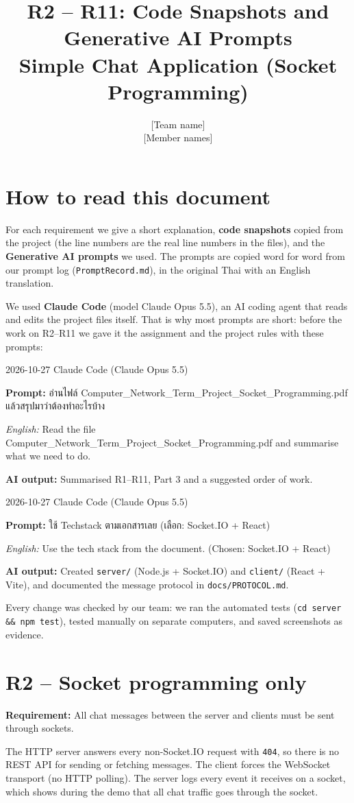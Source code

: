 \documentclass[11pt,a4paper]{article}
\title{\textbf{R2 -- R11: Code Snapshots and Generative AI Prompts}\\[2pt]
\large Simple Chat Application (Socket Programming)}
\author{{[Team name]} \\ {[Member names]}}
\date{}
\newcommand{\code}[1]{\texttt{#1}}
\newcommand{\req}[1]{\begin{tcolorbox}[colback=accent!6,colframe=accent!60,boxrule=0.5pt,left=4pt,right=4pt,top=2pt,bottom=2pt]\textbf{Requirement:} #1\end{tcolorbox}}
\newcommand{\promptbox}[4]{%
\begin{tcolorbox}[colback=codebg,colframe=gray!50,boxrule=0.4pt,left=4pt,right=4pt,top=2pt,bottom=2pt]
{\small #1 \quad Claude Code (Claude Opus 5.5)}\par
\textbf{Prompt:} #2\par
\textit{English:} #3\par
\textbf{AI output:} #4
\end{tcolorbox}}
\begin{document}
\maketitle

\section*{How to read this document}
For each requirement we give a short explanation, \textbf{code snapshots} copied from the project
(the line numbers are the real line numbers in the files), and the \textbf{Generative AI prompts} we
used. The prompts are copied word for word from our prompt log (\code{PromptRecord.md}), in the
original Thai with an English translation.

We used \textbf{Claude Code} (model Claude Opus 5.5), an AI coding agent that reads and edits the
project files itself. That is why most prompts are short: before the work on R2--R11 we gave it the
assignment and the project rules with these prompts:

\promptbox{2026-10-27}{อ่านไฟล์ Computer\_Network\_Term\_Project\_Socket\_Programming.pdf แล้วสรุปมาว่าต้องทำอะไรบ้าง}
{Read the file Computer\_Network\_Term\_Project\_Socket\_Programming.pdf and summarise what we need to do.}
{Summarised R1--R11, Part 3 and a suggested order of work.}

\promptbox{2026-10-27}{ใช้ Techstack ตามเอกสารเลย \newline (เลือก: Socket.IO + React)}
{Use the tech stack from the document. (Chosen: Socket.IO + React)}
{Created \code{server/} (Node.js + Socket.IO) and \code{client/} (React + Vite), and documented the
message protocol in \code{docs/PROTOCOL.md}.}

Every change was checked by our team: we ran the automated tests (\code{cd server \&\& npm test}),
tested manually on separate computers, and saved screenshots as evidence.

\clearpage
\section{R2 -- Socket programming only}
\req{All chat messages between the server and clients must be sent through sockets.}

The HTTP server answers every non-Socket.IO request with \code{404}, so there is
no REST API for sending or fetching messages. The client forces the WebSocket transport (no HTTP
polling). The server logs every event it receives on a socket, which shows during the demo that all
chat traffic goes through the socket.
\end{document}
